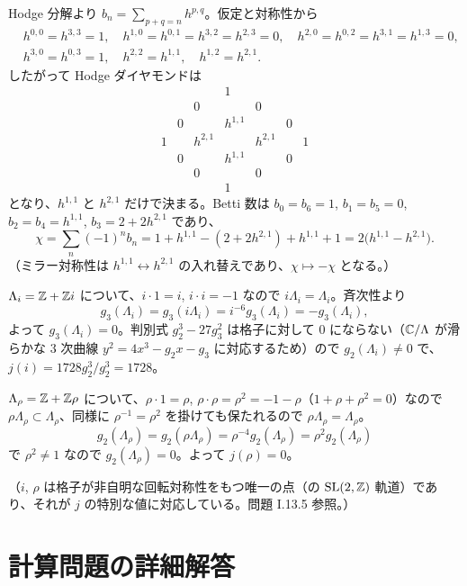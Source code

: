 Hodge 分解より $b_n=\sum_{p+q=n}h^{p,q}$。仮定と対称性から
\begin{align*}
  &h^{0,0}=h^{3,3}=1,\quad h^{1,0}=h^{0,1}=h^{3,2}=h^{2,3}=0,\quad h^{2,0}=h^{0,2}=h^{3,1}=h^{1,3}=0,\\
  &h^{3,0}=h^{0,3}=1,\quad h^{2,2}=h^{1,1},\quad h^{1,2}=h^{2,1}.
\end{align*}
したがって Hodge ダイヤモンドは
\[
\begin{array}{ccccccc}
 &&&1&&&\\
 &&0&&0&&\\
 &0&&h^{1,1}&&0&\\
 1&&h^{2,1}&&h^{2,1}&&1\\
 &0&&h^{1,1}&&0&\\
 &&0&&0&&\\
 &&&1&&&
\end{array}
\]
となり、$h^{1,1}$ と $h^{2,1}$ だけで決まる。Betti 数は $b_0=b_6=1$, $b_1=b_5=0$, $b_2=b_4=h^{1,1}$, $b_3=2+2h^{2,1}$ であり、
\[
  \chi=\sum_n(-1)^nb_n=1+h^{1,1}-(2+2h^{2,1})+h^{1,1}+1=2\bigl(h^{1,1}-h^{2,1}\bigr).
\]
（ミラー対称性は $h^{1,1}\leftrightarrow h^{2,1}$ の入れ替えであり、$\chi\mapsto-\chi$ となる。）

$\Lambda_i=\mathbb{Z}+\mathbb{Z} i$ について、$i\cdot1=i$, $i\cdot i=-1$ なので $i\Lambda_i=\Lambda_i$。斉次性より
\[
  g_3(\Lambda_i)=g_3(i\Lambda_i)=i^{-6}g_3(\Lambda_i)=-g_3(\Lambda_i),
\]
よって $g_3(\Lambda_i)=0$。判別式 $g_2^3-27g_3^2$ は格子に対して $0$ にならない（$\mathbb{C}/\Lambda$ が滑らかな $3$ 次曲線 $y^2=4x^3-g_2x-g_3$ に対応するため）ので $g_2(\Lambda_i)\neq0$ で、$j(i)=1728g_2^3/g_2^3=1728$。

$\Lambda_\rho=\mathbb{Z}+\mathbb{Z}\rho$ について、$\rho\cdot1=\rho$, $\rho\cdot\rho=\rho^2=-1-\rho$（$1+\rho+\rho^2=0$）なので $\rho\Lambda_\rho\subset\Lambda_\rho$、同様に $\rho^{-1}=\rho^2$ を掛けても保たれるので $\rho\Lambda_\rho=\Lambda_\rho$。
\[
  g_2(\Lambda_\rho)=g_2(\rho\Lambda_\rho)=\rho^{-4}g_2(\Lambda_\rho)=\rho^{2}g_2(\Lambda_\rho)
\]
で $\rho^2\neq1$ なので $g_2(\Lambda_\rho)=0$。よって $j(\rho)=0$。

（$i$, $\rho$ は格子が非自明な回転対称性をもつ唯一の点（の $\operatorname{SL}(2,\mathbb{Z})$ 軌道）であり、それが $j$ の特別な値に対応している。問題 I.13.5 参照。）

\section{計算問題の詳細解答}

